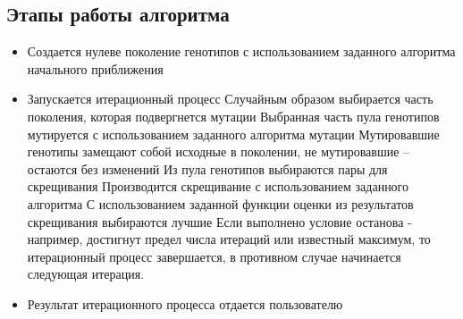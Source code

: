 \subsection{Этапы работы алгоритма}%
\begin{itemize}%
\item Создается нулеве поколение генотипов с использованием заданного алгоритма начального приближения
\item Запускается итерационный процесс
	\subitem Случайным образом выбирается часть поколения, которая подвергнется мутации
	\subitem Выбранная часть пула генотипов мутируется с использованием заданного алгоритма мутации
	\subitem Мутировавшие генотипы замещают собой исходные в поколении, не мутировавшие -- остаются без изменений
	\subitem Из пула генотипов выбираются пары для скрещивания
	\subitem Производится скрещивание с использованием заданного алгоритма
	\subitem С использованием заданной функции оценки из результатов скрещивания выбираются лучшие 
	\subitem Если выполнено условие останова - например, достигнут предел числа итераций или известный максимум, то итерационный процесс завершается, в противном случае  начинается следующая итерация.
\item Результат итерационного процесса отдается пользователю
\end{itemize}

